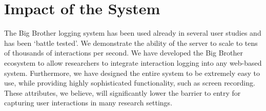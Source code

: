 \section{Impact of the System}

The Big Brother logging system has been used already in several user studies and has been `battle tested'. We demonstrate the ability of the \bb server to scale to tens of thousands of interactions per second. We have developed the Big Brother ecosystem to allow researchers to integrate interaction logging into any web-based system. Furthermore, we have designed the entire system to be extremely easy to use, while providing highly sophisticated functionality, such as screen recording. These attributes, we believe, will significantly lower the barrier to entry for capturing user interactions in many research settings.